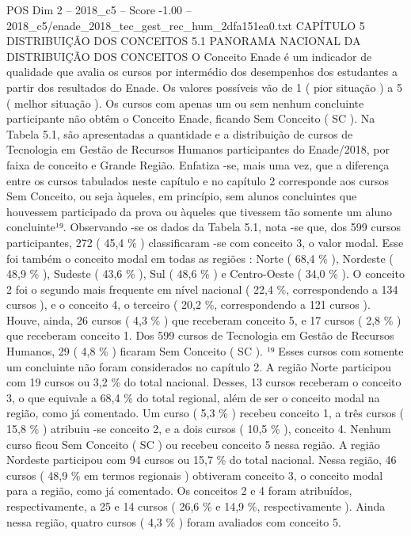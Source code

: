\begin{textsample}{POS Dim 2 – 2018\_c5 – Score -1.00 – 2018\_c5/enade\_2018\_tec\_gest\_rec\_hum\_2dfa151ea0.txt}  \label{ex:f2_pos_318}
CAPÍTULO 5 DISTRIBUIÇÃO DOS CONCEITOS 5.1 PANORAMA NACIONAL DA DISTRIBUIÇÃO DOS CONCEITOS O Conceito Enade é um indicador de qualidade que avalia os cursos por intermédio dos desempenhos dos estudantes a partir dos resultados do Enade.
Os valores possíveis vão de 1 ( pior situação ) a 5 ( melhor situação ).
Os cursos com apenas um ou sem nenhum concluinte participante não obtêm o Conceito Enade, ficando Sem Conceito ( SC ).
Na Tabela 5.1, são apresentadas a quantidade e a distribuição de cursos de Tecnologia em Gestão de Recursos Humanos participantes do Enade/2018, por faixa de conceito e Grande Região.
Enfatiza -se, mais uma vez, que a diferença entre os cursos tabulados neste capítulo e no capítulo 2 corresponde aos cursos Sem Conceito, ou seja àqueles, em princípio, sem alunos concluintes que houvessem participado da prova ou àqueles que tivessem tão somente um aluno concluinte¹⁹.
Observando -se os dados da Tabela 5.1, nota -se que, dos 599 cursos participantes, 272 ( 45,4 \% ) classificaram -se com conceito 3, o valor modal.
Esse foi também o conceito modal em todas as regiões : Norte ( 68,4 \% ), Nordeste ( 48,9 \% ), Sudeste ( 43,6 \% ), Sul ( 48,6 \% ) e Centro-Oeste ( 34,0 \% ).
O conceito 2 foi o segundo mais frequente em nível nacional ( 22,4 \%, correspondendo a 134 cursos ), e o conceito 4, o terceiro ( 20,2 \%, correspondendo a 121 cursos ).
Houve, ainda, 26 cursos ( 4,3 \% ) que receberam conceito 5, e 17 cursos ( 2,8 \% ) que receberam conceito 1.
Dos 599 cursos de Tecnologia em Gestão de Recursos Humanos, 29 ( 4,8 \% ) ficaram Sem Conceito ( SC ). ¹⁹ Esses cursos com somente um concluinte não foram considerados no capítulo 2.
A região Norte participou com 19 cursos ou 3,2 \% do total nacional.
Desses, 13 cursos receberam o conceito 3, o que equivale a 68,4 \% do total regional, além de ser o conceito modal na região, como já comentado.
Um curso ( 5,3 \% ) recebeu conceito 1, a três cursos ( 15,8 \% ) atribuiu -se conceito 2, e a dois cursos ( 10,5 \% ), conceito 4.
Nenhum curso ficou Sem Conceito ( SC ) ou recebeu conceito 5 nessa região.
A região Nordeste participou com 94 cursos ou 15,7 \% do total nacional.
Nessa região, 46 cursos ( 48,9 \% em termos regionais ) obtiveram conceito 3, o conceito modal para a região, como já comentado.
Os conceitos 2 e 4 foram atribuídos, respectivamente, a 25 e 14 cursos ( 26,6 \% e 14,9 \%, respectivamente ).
Ainda nessa região, quatro cursos ( 4,3 \% ) foram avaliados com conceito 5.

\end{textsample}
